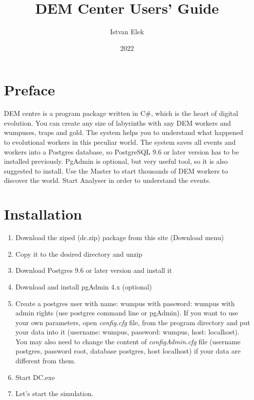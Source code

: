 \documentclass[a4paper,12pt]{article}
\begin{document}
\author{Istvan Elek}
\title{DEM Center Users' Guide}
\date{2022}

\maketitle
\newpage
\tableofcontents
\newpage


\section{Preface}

DEM centre is a program package written in C\#, which is the heart of digital evolution. You can create any size of labyrinths with any DEM workers and wumpuses, traps and gold. The system  helps you to understand what happened to  evolutional workers in this peculiar world. The system saves all events and workers into a Postgres database, so PostgreSQL 9.6 or later version has to be installed previously. PgAdmin is optional, but very useful tool, so it is also suggested to install. Use the Master to start thousands of DEM workers to discover the world. Start Analyser in order to understand the events.



\section{Installation}

\begin{enumerate}
	\item Download the ziped (dc.zip) package from this site (Download menu)
	\item Copy it to the desired directory and unzip
	\item Download Postgres 9.6 or later version and install it
	\item Download and install pgAdmin 4.x (optional)
	\item Create a postgres user with name: wumpus with password: wumpus with admin rights (use postgres command line or pgAdmin). If you want to use your own parameters, open \textit{config.cfg} file, from the program directory and put your data into it (username: wumpus,	password: wumpus, 	host: localhost). You may also need to change the content of \textit{configAdmin.cfg} file (username postgres, password root, database postgres, host localhost) if your data are different from them.
	\item Start DC.exe
	\item Let's start the simulation.
\end{enumerate}
\end{document}
